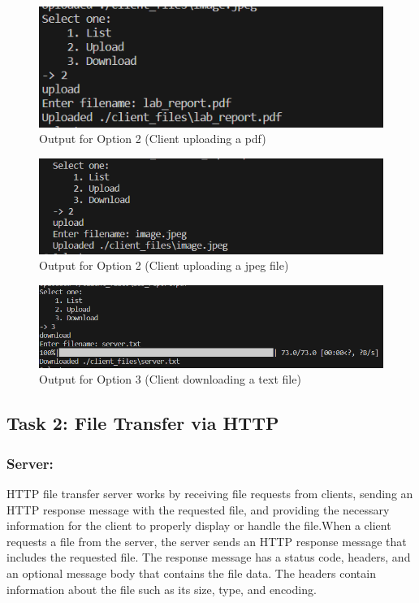 \documentclass[11pt]{article}
\begin{document}
\begin{figure}[H]
    \centering
    \includegraphics[scale=1.0]{Task 1/upload_pdf.png} 
    \caption{Output for Option 2 (Client uploading a pdf)}
    \label{fig: Output for Option 3}
\end{figure}

\begin{figure}[H]
    \centering
    \includegraphics[scale=1.0]{Task 1/upload.png} 
    \caption{Output for Option 2 (Client uploading a jpeg file)}
    \label{fig: Output for Option 3}
\end{figure}

\begin{figure}[H]
    \centering
    \includegraphics[scale=0.8]{Task 1/download_txt.png} 
    \caption{Output for Option 3 (Client downloading a text file)}
    \label{fig: Output for Option 3}
\end{figure}



\subsection{Task 2: File Transfer via HTTP}
\subsubsection{Server:}
HTTP file transfer server works by receiving file requests from clients, sending an HTTP response
message with the requested file, and providing the necessary information for the client to properly
display or handle the file.When a client requests a file from the server, the server sends an HTTP
response message that includes the requested file. The response message has a status code, headers,
and an optional message body that contains the file data. The headers contain information about
the file such as its size, type, and encoding.
\end{document}
